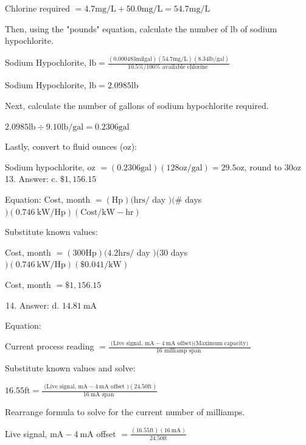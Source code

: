 \documentclass[10pt]{article}
\begin{document}
Chlorine required $=4.7 \mathrm{mg} / \mathrm{L}+50.0 \mathrm{mg} / \mathrm{L}=54.7 \mathrm{mg} / \mathrm{L}$

Then, using the "pounds" equation, calculate the number of lb of sodium hypochlorite.

Sodium Hypochlorite, $\mathrm{lb}=\frac{(0.000483 \mathrm{mil} \mathrm{gal})(54.7 \mathrm{mg} / \mathrm{L})(8.34 \mathrm{lb} / \mathrm{gal})}{10.5 \% / 100 \% \text { available chlorine }}$

Sodium Hypochlorite, $\mathrm{lb}=2.0985 \mathrm{lb}$

Next, calculate the number of gallons of sodium hypochlorite required.

$2.0985 \mathrm{lb} \div 9.10 \mathrm{lb} / \mathrm{gal}=0.2306 \mathrm{gal}$

Lastly, convert to fluid ounces (oz):

Sodium hypochlorite, oz $=(0.2306 \mathrm{gal})(128 \mathrm{oz} / \mathrm{gal})=29.5 \mathrm{oz}$, round to $30 \mathrm{oz}$ 13. Answer: c. $\$ 1,156.15$

Equation: Cost, month $=(\mathrm{Hp})(\mathrm{hrs} /$ day $)(\#$ days $)(0.746 \mathrm{~kW} / \mathrm{Hp})(\mathrm{Cost} / \mathrm{kW}-\mathrm{hr})$

Substitute known values:

Cost, month $=(300 \mathrm{Hp})(4.2 \mathrm{hrs} /$ day $)(30$ days $)(0.746 \mathrm{~kW} / \mathrm{Hp})(\$ 0.041 / \mathrm{kW})$

Cost, month $=\$ 1,156.15$

\begin{enumerate}
  \setcounter{enumi}{13}
  \item Answer: d. $14.81 \mathrm{~mA}$
\end{enumerate}

Equation:

Current process reading $=\frac{\text { (Live signal, } \mathrm{mA}-4 \mathrm{~mA} \text { offset)(Maximum capacity) }}{16 \text { milliamp span }}$

Substitute known values and solve:

$16.55 \mathrm{ft}=\frac{\text { (Live signal, } \mathrm{mA}-4 \mathrm{~mA} \text { offset })(24.50 \mathrm{ft})}{16 \mathrm{~mA} \text { span }}$

Rearrange formula to solve for the current number of milliamps.

Live signal, $\mathrm{mA}-4 \mathrm{~mA}$ offset $=\frac{(16.55 \mathrm{ft})(16 \mathrm{~mA})}{24.50 \mathrm{ft}}$
\end{document}
